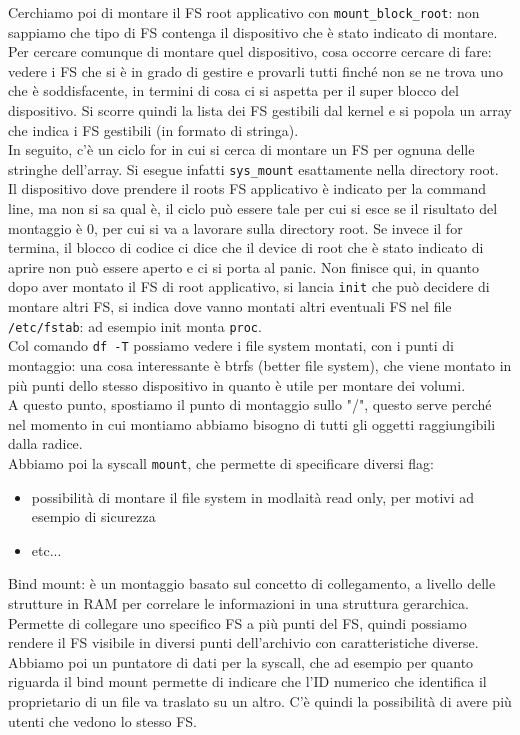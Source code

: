 \documentclass[12pt, oneside]{extbook}
\begin{document}
Cerchiamo poi di montare il FS root applicativo con \texttt{mount\_block\_root}:
non sappiamo che tipo di FS contenga il dispositivo che è stato indicato di montare. Per cercare comunque di montare quel dispositivo, cosa occorre cercare di fare: vedere i FS che si è in grado di gestire e provarli tutti finché non se ne trova uno che è soddisfacente, in termini di cosa ci si aspetta per il super blocco del dispositivo. Si scorre quindi la lista dei FS gestibili dal kernel e si popola un array che indica i FS gestibili (in formato di stringa).\\In seguito, c'è un ciclo for in cui si cerca di montare un FS per ognuna delle stringhe dell'array. Si esegue infatti \texttt{sys\_mount} esattamente nella directory root.\\Il dispositivo dove prendere il roots FS applicativo è indicato per la command line, ma non si sa qual è, il ciclo può essere tale per cui si esce se il risultato del montaggio è 0, per cui si va a lavorare sulla directory root. Se invece il for termina, il blocco di codice ci dice che il device di root che è stato indicato di aprire non può essere aperto e ci si porta al panic. Non finisce qui, in quanto dopo aver montato il FS di root applicativo, si lancia \texttt{init} che può decidere di montare altri FS, si indica dove vanno montati altri eventuali FS nel file \texttt{/etc/fstab}: ad esempio init monta \texttt{proc}.\\Col comando \texttt{df -T} possiamo vedere i file system montati, con i punti di montaggio: una cosa interessante è btrfs (better file system), che viene montato in più punti dello stesso dispositivo in quanto è utile per montare dei volumi.\\A questo punto, spostiamo il punto di montaggio sullo "/", questo serve perché nel momento in cui montiamo abbiamo bisogno di tutti gli oggetti raggiungibili dalla radice.\\Abbiamo poi la syscall \texttt{mount}, che permette di specificare diversi flag:
\begin{itemize}
	\item possibilità di montare il file system in modlaità read only, per motivi ad esempio di sicurezza
	\item etc...
\end{itemize}
Bind mount: è un montaggio basato sul concetto di collegamento, a livello delle strutture in RAM per correlare le informazioni in una struttura gerarchica. Permette di collegare uno specifico FS a più punti del FS, quindi possiamo rendere il FS visibile in diversi punti dell'archivio con caratteristiche diverse. Abbiamo poi un puntatore di dati per la syscall, che ad esempio per quanto riguarda il bind mount permette di indicare che l'ID numerico che identifica il proprietario di un file va traslato su un altro. C'è quindi la possibilità di avere più utenti che vedono lo stesso FS.\\\\
\end{document}
